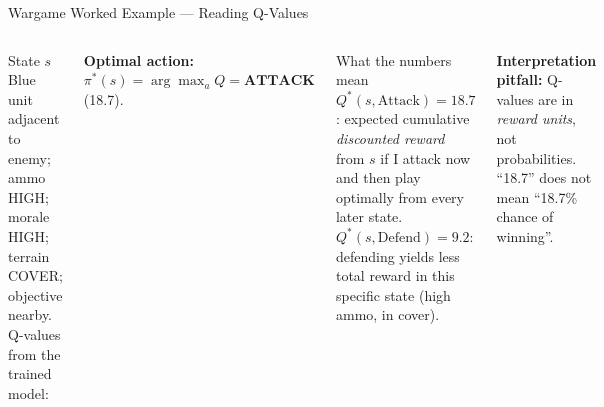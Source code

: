 \documentclass[aspectratio=169,10pt,t]{beamer}
\begin{document}
\begin{frame}{Wargame Worked Example --- Reading Q-Values}
\begin{columns}[T]
\begin{cbox}[ISSAnavy]{State $s$}\scriptsize Blue unit adjacent to enemy; ammo HIGH; morale HIGH; terrain COVER; objective nearby. Q-values from the trained model:\end{cbox}
\begin{rbox}\scriptsize\textbf{Optimal action:} $\pi^{*}(s)=\arg\max_a Q=\textbf{ATTACK}$ (18.7).\end{rbox}
\begin{cbox}{What the numbers mean}\scriptsize $Q^{*}(s,\text{Attack})=18.7$: expected cumulative \emph{discounted reward} from $s$ if I attack now and then play optimally from every later state. $Q^{*}(s,\text{Defend})=9.2$: defending yields less total reward in this specific state (high ammo, in cover).\end{cbox}
\begin{wbox}\scriptsize\textbf{Interpretation pitfall:} Q-values are in \emph{reward units}, not probabilities. ``18.7'' does not mean ``18.7\% chance of winning''.\end{wbox}
\end{columns}
\end{frame}
\end{document}
